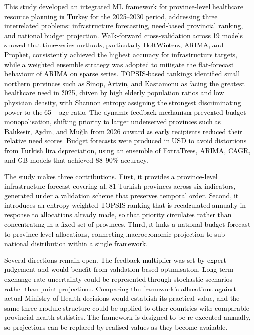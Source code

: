 \documentclass[final, 9pt, twocolumn]{saucis}
\newcommand{\rev}[1]{\textcolor{black}{#1}}
\begin{document}
\rev{This study developed an integrated ML framework for province-level
healthcare resource planning in Turkey for the 2025--2030 period, addressing
three interrelated problems: infrastructure forecasting, need-based provincial
ranking, and national budget projection. Walk-forward cross-validation across 19
models showed that time-series methods, particularly HoltWinters, ARIMA, and
Prophet, consistently achieved the highest accuracy for infrastructure targets,
while a weighted ensemble strategy was adopted to mitigate the flat-forecast
behaviour of ARIMA on sparse series. TOPSIS-based rankings identified small
northern provinces such as Sinop, Artvin, and Kastamonu as facing the greatest
healthcare need in 2025, driven by high elderly population ratios and low
physician density, with Shannon entropy assigning the strongest discriminating
power to the 65+ age ratio. The dynamic feedback mechanism prevented budget
monopolisation, shifting priority to larger underserved provinces such as
Balıkesir, Aydın, and Muğla from 2026 onward as early recipients reduced their
relative need scores. Budget forecasts were produced in USD to avoid distortions
from Turkish lira depreciation, using an ensemble of ExtraTrees, ARIMA, CAGR,
and GB models that achieved 88--90\% accuracy.}

\rev{The study makes three contributions. First, it provides a province-level
infrastructure forecast covering all 81 Turkish provinces across six indicators,
generated under a validation scheme that preserves temporal order. Second, it
introduces an entropy-weighted TOPSIS ranking that is recalculated annually in
response to allocations already made, so that priority circulates rather than
concentrating in a fixed set of provinces. Third, it links a national budget
forecast to province-level allocations, connecting macroeconomic projection to
sub-national distribution within a single framework.}

\rev{Several directions remain open. The feedback multiplier was set by expert
judgement and would benefit from validation-based optimisation. Long-term
exchange rate uncertainty could be represented through stochastic scenarios
rather than point projections. Comparing the framework's allocations against
actual Ministry of Health decisions would establish its practical value, and the
same three-module structure could be applied to other countries with
comparable provincial health statistics. The framework is designed to be
re-executed annually, so projections can be replaced by realised values as they
become available.}
\end{document}
